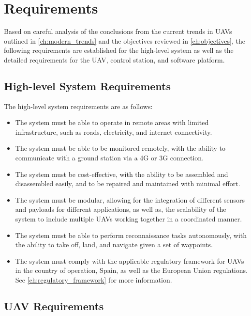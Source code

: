 \chapter{Requirements}

Based on careful analysis of the conclusions from the current trends in UAVs outlined in \cref{ch:modern_trends} and the objectives reviewed in \cref{ch:objectives}, the following requirements are established for the high-level system as well as the detailed requirements for the UAV, control station, and software platform.

\section{High-level System Requirements}

The high-level system requirements are as follows:

\begin{itemize}
  \item The system must be able to operate in remote areas with limited infrastructure, such as roads, electricity, and internet connectivity.

  \item The system must be able to be monitored remotely, with the ability to communicate with a ground station via a 4G or 3G connection.

  \item The system must be cost-effective, with the ability to be assembled and disassembled easily, and to be repaired and maintained with minimal effort.

  \item The system must be modular, allowing for the integration of different sensors and payloads for different applications, as well as, the scalability of the system to include multiple UAVs working together in a coordinated manner.

  \item The system must be able to perform reconnaissance tasks autonomously, with the ability to take off, land, and navigate given a set of waypoints.

  \item The system must comply with the applicable regulatory framework for UAVs in the country of operation, Spain, as well as the European Union regulations. See \cref{ch:regulatory_framework} for more information.
\end{itemize}

\section{UAV Requirements}

